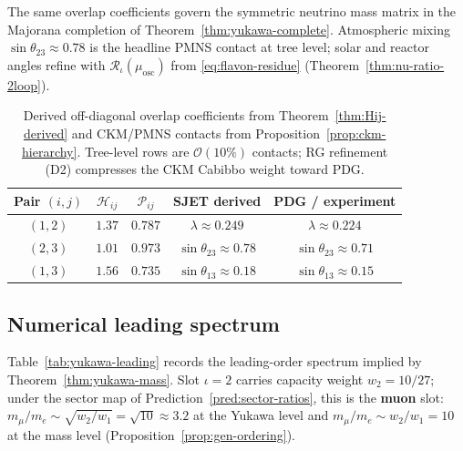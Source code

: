 \begin{remark}
The same overlap coefficients govern the symmetric neutrino mass matrix in the
Majorana completion of Theorem~\ref{thm:yukawa-complete}. Atmospheric mixing
$\sin\theta_{23}\approx 0.78$ is the headline PMNS contact at tree level;
solar and reactor angles refine with $\mathcal{R}_\iota(\mu_{\mathrm{osc}})$
from \eqref{eq:flavon-residue} (Theorem~\ref{thm:nu-ratio-2loop}).
\end{remark}

\begin{table}[ht]
\centering
\small
\renewcommand{\arraystretch}{1.12}
\begin{tabular}{@{}ccccc@{}}
\toprule
\textbf{Pair $(i,j)$} & $\mathcal{H}_{ij}$ & $\mathcal{P}_{ij}$ &
SJET derived & PDG / experiment \\
\midrule
$(1,2)$ & $1.37$ & $0.787$ &
  $\lambda\approx 0.249$ &
  $\lambda\approx0.224$ \\
$(2,3)$ & $1.01$ & $0.973$ &
  $\sin\theta_{23}\approx 0.78$ &
  $\sin\theta_{23}\approx 0.71$ \\
$(1,3)$ & $1.56$ & $0.735$ &
  $\sin\theta_{13}\approx 0.18$ &
  $\sin\theta_{13}\approx 0.15$ \\
\bottomrule
\end{tabular}
\caption{Derived off-diagonal overlap coefficients from
Theorem~\ref{thm:Hij-derived} and CKM/PMNS contacts from
Proposition~\ref{prop:ckm-hierarchy}. Tree-level rows are
$\mathcal{O}(10\%)$ contacts; RG refinement (D2) compresses the CKM Cabibbo
weight toward PDG.}
\label{tab:Pij-ckm}
\end{table}

\subsection{Numerical leading spectrum}
\label{sec:yukawa:numerical}

Table~\ref{tab:yukawa-leading} records the leading-order spectrum implied by
Theorem~\ref{thm:yukawa-mass}. Slot $\iota=2$ carries capacity weight
$w_2=10/27$; under the sector map of Prediction~\ref{pred:sector-ratios},
this is the \textbf{muon} slot: $m_\mu/m_e\sim\sqrt{w_2/w_1}=\sqrt{10}\approx
3.2$ at the Yukawa level and $m_\mu/m_e\sim w_2/w_1=10$ at the mass level
(Proposition~\ref{prop:gen-ordering}).

